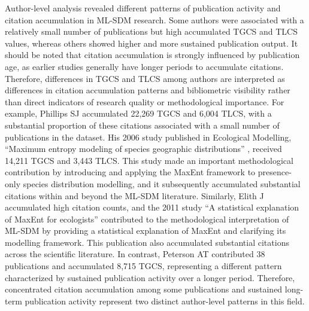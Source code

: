 \documentclass[authoryear,preprint,review,12pt]{elsarticle}
\begin{document}
Author-level analysis revealed different patterns of publication activity and citation accumulation in ML-SDM research. Some authors were associated with a relatively small number of publications but high accumulated TGCS and TLCS values, whereas others showed higher and more sustained publication output. It should be noted that citation accumulation is strongly influenced by publication age, as earlier studies generally have longer periods to accumulate citations. Therefore, differences in TGCS and TLCS among authors are interpreted as differences in citation accumulation patterns and bibliometric visibility rather than direct indicators of research quality or methodological importance. For example, Phillips SJ accumulated 22,269 TGCS and 6,004 TLCS, with a substantial proportion of these citations associated with a small number of publications in the dataset. His 2006 study published in Ecological Modelling, “Maximum entropy modeling of species geographic distributions” \citep{phillips2006maximum}, received 14,211 TGCS and 3,443 TLCS. This study made an important methodological contribution by introducing and applying the MaxEnt framework to presence-only species distribution modelling, and it subsequently accumulated substantial citations within and beyond the ML-SDM literature. Similarly, Elith J accumulated high citation counts, and the 2011 study “A statistical explanation of MaxEnt for ecologists” \citep{elith2011statistical} contributed to the methodological interpretation of ML-SDM by providing a statistical explanation of MaxEnt and clarifying its modelling framework. This publication also accumulated substantial citations across the scientific literature. In contrast, Peterson AT contributed 38 publications and accumulated 8,715 TGCS, representing a different pattern characterized by sustained publication activity over a longer period. Therefore, concentrated citation accumulation among some publications and sustained long-term publication activity represent two distinct author-level patterns in this field.
\end{document}
